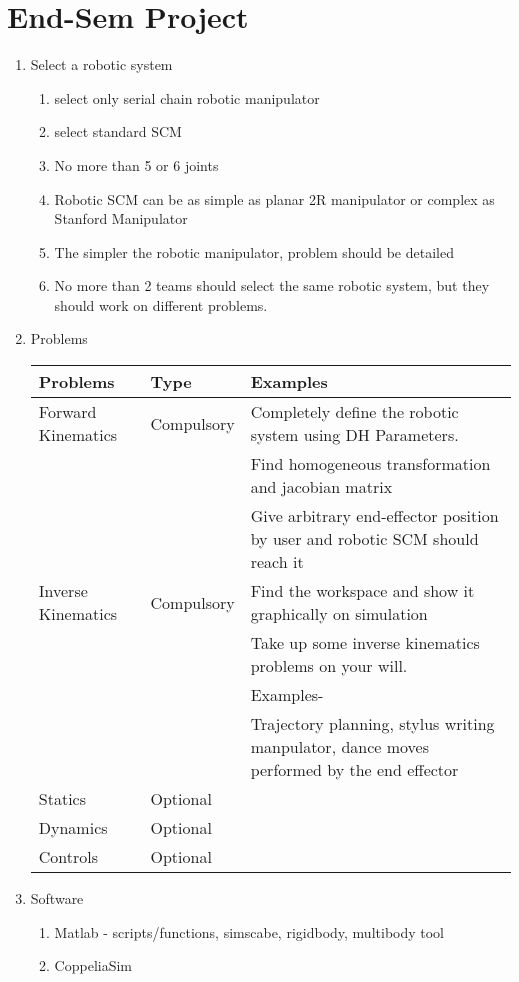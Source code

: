 \documentclass[11pt]{report}
\begin{document}
\part{End-Sem Project}
\label{sec:org91f29aa}
\begin{enumerate}
\item Select a robotic system
\begin{enumerate}
\item select only serial chain robotic manipulator
\item select standard SCM
\item No more than 5 or 6 joints
\item Robotic SCM can be as simple as planar 2R manipulator or complex as Stanford Manipulator
\item The simpler the robotic manipulator, problem should be detailed
\item No more than 2 teams should select the same robotic system, but they should work on different problems.
\end{enumerate}
\item Problems
\begin{center}
\begin{tabular}{lll}
\hline
Problems & Type & Examples\\
\hline
Forward Kinematics & Compulsory & Completely define the robotic system using DH Parameters.\\
 &  & Find homogeneous transformation and jacobian matrix\\
 &  & Give arbitrary end-effector position by user and robotic SCM should reach it\\
\hline
Inverse Kinematics & Compulsory & Find the workspace and show it graphically on simulation\\
 &  & Take up some inverse kinematics problems on your will.\\
 &  & Examples-\\
 &  & Trajectory planning, stylus writing manpulator, dance moves performed by the end effector\\
\hline
Statics & Optional & \\
Dynamics & Optional & \\
Controls & Optional & \\
\hline
\end{tabular}
\end{center}
\item Software
\begin{enumerate}
\item Matlab - scripts/functions, simscabe, rigidbody, multibody tool
\item CoppeliaSim
\end{enumerate}
\end{enumerate}
\end{document}
